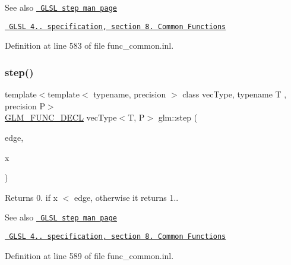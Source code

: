 \begin{DoxySeeAlso}{See also}
\href{http://www.opengl.org/sdk/docs/manglsl/xhtml/step.xml}{\texttt{ G\+L\+SL step man page}} 

\href{http://www.opengl.org/registry/doc/GLSLangSpec.4.20.8.pdf}{\texttt{ G\+L\+SL 4.. specification, section 8. Common Functions}} 
\end{DoxySeeAlso}


Definition at line 583 of file func\+\_\+common.\+inl.

\mbox{\label{group__core__func__common_gaf15b74ab672af2c7d7b535a9b4803700}} 
\subsubsection{\texorpdfstring{step()}{step()}\hspace{0.1cm}{\footnotesize\ttfamily [2/3]}}
{\footnotesize\ttfamily template$<$template$<$ typename, precision $>$ class vec\+Type, typename T , precision P$>$ \\
\mbox{\hyperlink{setup_8hpp_ab2d052de21a70539923e9bcbf6e83a51}{G\+L\+M\+\_\+\+F\+U\+N\+C\+\_\+\+D\+E\+CL}} vec\+Type$<$T, P$>$ glm\+::step (\begin{DoxyParamCaption}\item[{T}]{edge,  }\item[{vec\+Type$<$ T, P $>$ const \&}]{x }\end{DoxyParamCaption})}

Returns 0. if x $<$ edge, otherwise it returns 1..

\begin{DoxySeeAlso}{See also}
\href{http://www.opengl.org/sdk/docs/manglsl/xhtml/step.xml}{\texttt{ G\+L\+SL step man page}} 

\href{http://www.opengl.org/registry/doc/GLSLangSpec.4.20.8.pdf}{\texttt{ G\+L\+SL 4.. specification, section 8. Common Functions}} 
\end{DoxySeeAlso}


Definition at line 589 of file func\+\_\+common.\+inl.

\mbox{\label{group__core__func__common_ga6d84170051fb87c183c38883ec85b411}} 
